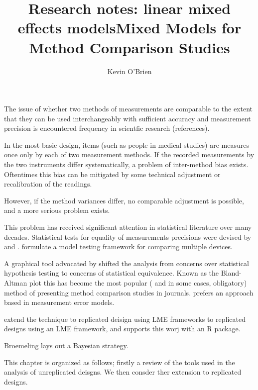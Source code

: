 \documentclass[12pt, a4paper]{report}
\title{Research notes: linear mixed effects models}
\author{ } \date{ }
\theoremstyle{plain}
\theoremstyle{definition}
\theoremstyle{remark}
\begin{document}
	\author{Kevin O'Brien}
	\title{Mixed Models for Method Comparison Studies}
	\tableofcontents
	
	\newpage
	

The issue of whether two methods of measurements are 
comparable to the extent that they can be used 
interchangeably with sufficient accuracy and measurement precision is encountered frequency in scientfic research (references).


In the most basic design, items (such as people in medical studies) are measures once only by each of two measurement methods. 
If the recorded measurements by the two instruments differ systematically, a problem of inter-method bias exists. Oftentimes this bias can be mitigated by some technical adjustment or recalibration of the readings.

However, if the method variances differ, no comparable adjustment is possible, and a more serious problem exists.


This problem has received significant attention in statistical literature over many decades.
Statistical tests for equality of measurements precisions were devised by \citet{Pitman} and \citet{Morgan}. \citet{Grubbs48,Grubbs73} formulate a model testing framework for comparing multiple devices.




A graphical tool advocated by \citet{BA83,BA86} shifted the analysis from concerns over statistical hypothesis testing to concerns of statistical equivalence. Known as the Bland-Altman plot this has become the most popular ( and in some cases, obligatory) method of presenting method comparison studies in journals.
\citet{DunnSEME} prefers an approach based in measurement error models.



\citet{BXC2008} extend the technique to replicated deisign using LME frameworks to replicated designs using an LME framework, and supports this worj with an R package.

Broemeling lays out a Bayesian strategy.



This chapter is organized as follows; firstly a review of the tools used in the analysis of unreplicated deisgns. We then consder ther extension to replicated designs.
\end{document}
